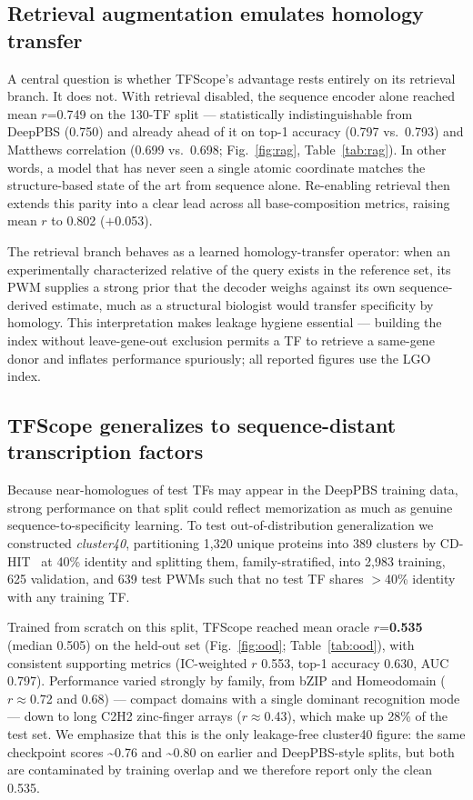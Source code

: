 \documentclass[11pt,letterpaper]{article}
\newcommand{\ts}{\textasciitilde}
\begin{document}
\subsection*{Retrieval augmentation emulates homology transfer}

A central question is whether TFScope's advantage rests entirely on its retrieval
branch. It does not. With retrieval disabled, the sequence encoder alone reached
mean $r$=0.749 on the 130-TF split — statistically indistinguishable from DeepPBS
(0.750) and already ahead of it on top-1 accuracy (0.797 vs.\ 0.793) and Matthews
correlation (0.699 vs.\ 0.698; Fig.~\ref{fig:rag}, Table~\ref{tab:rag}). In other
words, a model that has never seen a single atomic coordinate matches the
structure-based state of the art from sequence alone. Re-enabling retrieval then
extends this parity into a clear lead across all base-composition metrics, raising
mean $r$ to 0.802 ($+$0.053).

The retrieval branch behaves as a learned homology-transfer operator: when an
experimentally characterized relative of the query exists in the reference set, its
PWM supplies a strong prior that the decoder weighs against its own sequence-derived
estimate, much as a structural biologist would transfer specificity by homology.
This interpretation makes leakage hygiene essential — building the index without
leave-gene-out exclusion permits a TF to retrieve a same-gene donor and inflates
performance spuriously; all reported figures use the LGO index.

\subsection*{TFScope generalizes to sequence-distant transcription factors}

Because near-homologues of test TFs may appear in the DeepPBS training data, strong
performance on that split could reflect memorization as much as genuine
sequence-to-specificity learning. To test out-of-distribution generalization we
constructed \textit{cluster40}, partitioning 1,320 unique proteins into 389 clusters
by CD-HIT~\cite{LiGodzik2006} at 40\% identity and splitting them, family-stratified,
into 2,983 training, 625 validation, and 639 test PWMs such that no test TF shares
$>$40\% identity with any training TF.

Trained from scratch on this split, TFScope reached mean oracle $r$=\textbf{0.535}
(median 0.505) on the held-out set (Fig.~\ref{fig:ood};
Table~\ref{tab:ood}), with consistent supporting metrics (IC-weighted $r$ 0.553,
top-1 accuracy 0.630, AUC 0.797). Performance varied strongly by family, from bZIP
and Homeodomain ($r\approx$0.72 and 0.68) — compact domains with a single dominant
recognition mode — down to long C2H2 zinc-finger arrays ($r\approx$0.43), which make
up 28\% of the test set. We emphasize that this is the only leakage-free cluster40
figure: the same checkpoint scores \ts0.76 and \ts0.80 on earlier and DeepPBS-style
splits, but both are contaminated by training overlap and we therefore report only
the clean 0.535.
\end{document}
